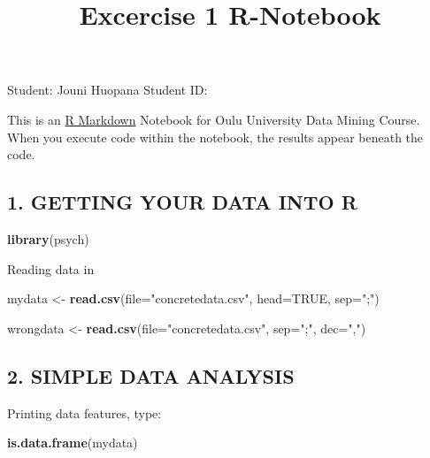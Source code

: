 \documentclass[]{article}
\title{Excercise 1 R-Notebook}
\author{}
\date{}
\newenvironment{Shaded}{\begin{snugshade}}{\end{snugshade}}
\newcommand{\DataTypeTok}[1]{\textcolor[rgb]{0.13,0.29,0.53}{#1}}
\newcommand{\KeywordTok}[1]{\textcolor[rgb]{0.13,0.29,0.53}{\textbf{#1}}}
\newcommand{\NormalTok}[1]{#1}
\newcommand{\OtherTok}[1]{\textcolor[rgb]{0.56,0.35,0.01}{#1}}
\newcommand{\StringTok}[1]{\textcolor[rgb]{0.31,0.60,0.02}{#1}}
\begin{document}
\maketitle

Student: Jouni Huopana Student ID:

This is an \href{http://rmarkdown.rstudio.com}{R Markdown} Notebook for
Oulu University Data Mining Course. When you execute code within the
notebook, the results appear beneath the code.

\hypertarget{getting-your-data-into-r}{%
\subsection{1. GETTING YOUR DATA INTO
R}\label{getting-your-data-into-r}}

\begin{Shaded}
\begin{Highlighting}[]
\KeywordTok{library}\NormalTok{(psych)}
\end{Highlighting}
\end{Shaded}

Reading data in

\begin{Shaded}
\begin{Highlighting}[]
\NormalTok{mydata <-}\StringTok{ }\KeywordTok{read.csv}\NormalTok{(}\DataTypeTok{file=}\StringTok{"concretedata.csv"}\NormalTok{, }\DataTypeTok{head=}\OtherTok{TRUE}\NormalTok{, }\DataTypeTok{sep=}\StringTok{";"}\NormalTok{)}

\NormalTok{wrongdata <-}\StringTok{ }\KeywordTok{read.csv}\NormalTok{(}\DataTypeTok{file=}\StringTok{"concretedata.csv"}\NormalTok{, }\DataTypeTok{sep=}\StringTok{";"}\NormalTok{, }\DataTypeTok{dec=}\StringTok{","}\NormalTok{)}
\end{Highlighting}
\end{Shaded}

\hypertarget{simple-data-analysis}{%
\subsection{2. SIMPLE DATA ANALYSIS}\label{simple-data-analysis}}

Printing data features, type:

\begin{Shaded}
\begin{Highlighting}[]
\KeywordTok{is.data.frame}\NormalTok{(mydata)}
\end{Highlighting}
\end{Shaded}
\end{document}
